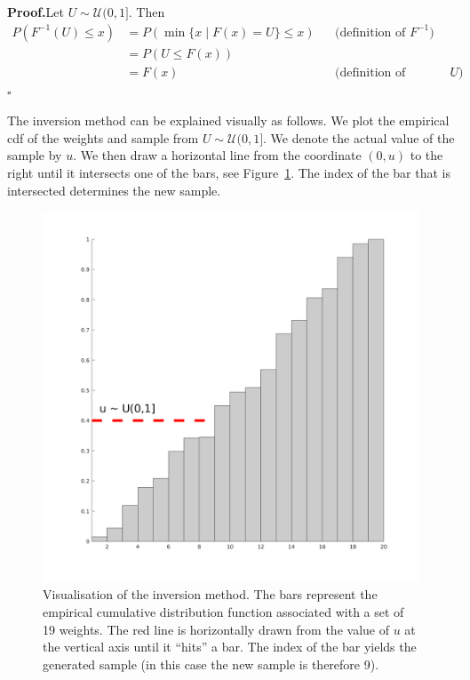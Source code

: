 \textbf{Proof.}\quad Let $U \sim \mathcal{U} (0,1]$. Then
\begin{align*}
  P(F^{-1}(U) \le x) &= P(\min \{x \mid F(x) = U \} \le x ) && \text{(definition of $F^{-1}$)} \\
                     &= P(U \le F(x)) \\
                     &= F(x) && \text{(definition of distribution of $U$)}\,.
\end{align*}
\hfill$\square$

The inversion method can be explained visually as follows. We plot the
empirical cdf of the weights and sample from
$U \sim \mathcal{U}(0,1]$. We denote the actual value of the sample by
$u$. We then draw a horizontal line from the coordinate $(0,u)$ to the
right until it intersects one of the bars, see
Figure~\ref{fig:ecdf}. The index of the bar that is intersected
determines the new sample.

\begin{figure}[htpb]
  \centering \includegraphics[width=\textwidth]{figures/ecdf.png}
  \caption{Visualisation of the inversion method. The bars represent
    the empirical cumulative distribution function associated with a
    set of 19 weights. The red line is horizontally drawn from the
    value of $u$ at the vertical axis until it ``hits'' a bar. The
    index of the bar yields the generated sample (in this case the new
    sample is therefore 9). }
  \label{fig:ecdf}
\end{figure}

